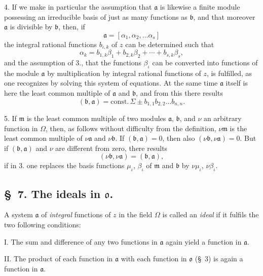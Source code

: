 \documentclass{article}
\begin{document}
4. If we make in particular the assumption that $\mathfrak{a}$ is likewise a finite module possessing an irreducible basis of just as many functions as $\mathfrak{b}$, and that moreover $\mathfrak{a}$ is divisible by $\mathfrak{b}$, then, if
\[ \mathfrak{a} = [\alpha_{1}, \alpha_{2}, \ldots \alpha_{s}] \]
the integral rational functions $b_{\iota,k}$ of $z$ can be determined such that
\[ \alpha_{k} = b_{1,k}\beta_{1} + b_{2,k}\beta_{2} + \cdots + b_{s,k}\beta_{s}, \]
and the assumption of 3., that the functions $\beta_{\iota}$ can be converted into functions of the module $\mathfrak{a}$ by multiplication by integral rational functions of $z$, is fulfilled, as one recognizes by solving this system of equations. At the same time $\mathfrak{a}$ itself is here the least common multiple of $\mathfrak{a}$ and $\mathfrak{b}$, and from this there results
\[ (\mathfrak{b}, \mathfrak{a}) = \text{const.}\,\Sigma \pm b_{1,1}b_{2,2}\ldots b_{n,n}. \]

5. If $\mathfrak{m}$ is the least common multiple of two modules $\mathfrak{a}$, $\mathfrak{b}$, and $\nu$ an arbitrary function in $\Omega$, then, as follows without difficulty from the definition, $\nu\mathfrak{m}$ is the least common multiple of $\nu\mathfrak{a}$ and $\nu\mathfrak{b}$. If $(\mathfrak{b}, \mathfrak{a}) = 0$, then also $(\nu\mathfrak{b}, \nu\mathfrak{a}) = 0$. But if $(\mathfrak{b}, \mathfrak{a})$ and $\nu$ are different from zero, there results
\[ (\nu\mathfrak{b}, \nu\mathfrak{a}) = (\mathfrak{b}, \mathfrak{a}), \]
if in 3. one replaces the basis functions $\mu_{\iota}$, $\beta_{\iota}$ of $\mathfrak{m}$ and $\mathfrak{b}$ by $\nu\mu_{\iota}$, $\nu\beta_{\iota}$.

\subsection*{§~7. The ideals in $\mathfrak{o}$.}

A system $\mathfrak{a}$ of \emph{integral} functions of $z$ in the field $\Omega$ is called an \emph{ideal} if it fulfils the two following conditions:


I. The sum and difference of any two functions in $\mathfrak{a}$ again yield a function in $\mathfrak{a}$.

II. The product of each function in $\mathfrak{a}$ with each function in $\mathfrak{o}$ (§~3) is again a function in $\mathfrak{a}$.
\end{document}
